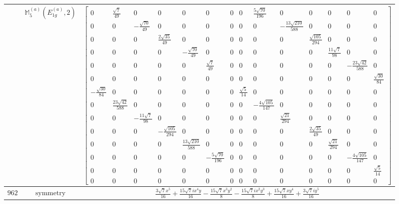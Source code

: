 \documentclass[fleqn,8pt,landscape]{jsarticle}
\begin{document}
\begin{longtable}{ccc}
$  $ & $ \mathbb{M}_{5}^{(a)}(E_{1g}^{(a)},2) $ & $ \begin{bmatrix} 0 & \frac{\sqrt{7}}{49} & 0 & 0 & 0 & 0 & 0 & 0 & \frac{5 \sqrt{70}}{196} & 0 & 0 & 0 & 0 & 0 \\ 0 & 0 & - \frac{\sqrt{70}}{49} & 0 & 0 & 0 & 0 & 0 & 0 & - \frac{13 \sqrt{210}}{588} & 0 & 0 & 0 & 0 \\ 0 & 0 & 0 & \frac{2 \sqrt{35}}{49} & 0 & 0 & 0 & 0 & 0 & 0 & \frac{\sqrt{105}}{294} & 0 & 0 & 0 \\ 0 & 0 & 0 & 0 & - \frac{\sqrt{70}}{49} & 0 & 0 & 0 & 0 & 0 & 0 & \frac{11 \sqrt{7}}{98} & 0 & 0 \\ 0 & 0 & 0 & 0 & 0 & \frac{\sqrt{7}}{49} & 0 & 0 & 0 & 0 & 0 & 0 & - \frac{23 \sqrt{42}}{588} & 0 \\ 0 & 0 & 0 & 0 & 0 & 0 & 0 & 0 & 0 & 0 & 0 & 0 & 0 & \frac{\sqrt{30}}{84} \\ - \frac{\sqrt{30}}{84} & 0 & 0 & 0 & 0 & 0 & 0 & \frac{\sqrt{5}}{14} & 0 & 0 & 0 & 0 & 0 & 0 \\ 0 & \frac{23 \sqrt{42}}{588} & 0 & 0 & 0 & 0 & 0 & 0 & - \frac{4 \sqrt{105}}{147} & 0 & 0 & 0 & 0 & 0 \\ 0 & 0 & - \frac{11 \sqrt{7}}{98} & 0 & 0 & 0 & 0 & 0 & 0 & \frac{\sqrt{21}}{294} & 0 & 0 & 0 & 0 \\ 0 & 0 & 0 & - \frac{\sqrt{105}}{294} & 0 & 0 & 0 & 0 & 0 & 0 & \frac{2 \sqrt{35}}{49} & 0 & 0 & 0 \\ 0 & 0 & 0 & 0 & \frac{13 \sqrt{210}}{588} & 0 & 0 & 0 & 0 & 0 & 0 & \frac{\sqrt{21}}{294} & 0 & 0 \\ 0 & 0 & 0 & 0 & 0 & - \frac{5 \sqrt{70}}{196} & 0 & 0 & 0 & 0 & 0 & 0 & - \frac{4 \sqrt{105}}{147} & 0 \\ 0 & 0 & 0 & 0 & 0 & 0 & 0 & 0 & 0 & 0 & 0 & 0 & 0 & \frac{\sqrt{5}}{14} \\ 0 & 0 & 0 & 0 & 0 & 0 & 0 & 0 & 0 & 0 & 0 & 0 & 0 & 0 \end{bmatrix} $ \\ \hline
$ 962 $ & $ \text{symmetry} $ & $ \frac{3 \sqrt{7} x^{5}}{16} + \frac{15 \sqrt{7} i x^{4} y}{16} - \frac{15 \sqrt{7} x^{3} y^{2}}{8} - \frac{15 \sqrt{7} i x^{2} y^{3}}{8} + \frac{15 \sqrt{7} x y^{4}}{16} + \frac{3 \sqrt{7} i y^{5}}{16} $ \\

\end{longtable}
\end{document}
